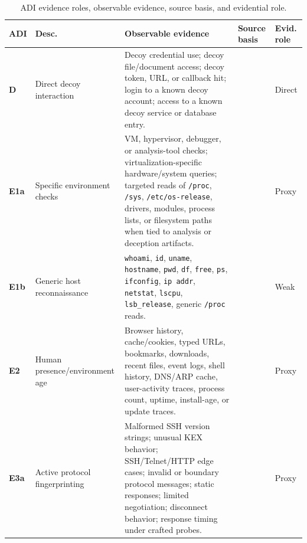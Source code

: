 \begin{table}[!t]
\centering
\caption{ADI evidence roles, observable evidence, source basis, and evidential role.}
\label{tab:adi-evidence-model}
\scriptsize
\setlength{\tabcolsep}{2.5pt}
\renewcommand{\arraystretch}{1.12}
\begin{tabular}[l,l,c,c,c]{p{}p{}p{}p{}p{}}
\hline
\textbf{ADI} &
\textbf{Desc.} &
\textbf{Observable evidence} &
\textbf{Source basis} &
\textbf{Evid. role} \\
\hline

\textbf{D} &
Direct decoy interaction &
Decoy credential use; decoy file/document access; decoy token, URL, or callback hit; login to a known decoy account; access to a known decoy service or database entry. &
\cite{mitre_d3fend_decoy_object,mitre_d3fend_decoy_file,mitre_d3fend_decoy_user_credential,mitre_d3fend_decoy_session_token,reti2020rabbit,cowrie} &
Direct \\

\textbf{E1a} &
Specific environment checks &
VM, hypervisor, debugger, or analysis-tool checks; virtualization-specific hardware/system queries; targeted reads of \texttt{/proc}, \texttt{/sys}, \texttt{/etc/os-release}, drivers, modules, process lists, or filesystem paths when tied to analysis or deception artifacts. &
\cite{mitre_attack_t1497_001,afianian2019malware,uitto2017survey} &
Proxy \\

\textbf{E1b} &
Generic host reconnaissance &
\texttt{whoami}, \texttt{id}, \texttt{uname}, \texttt{hostname}, \texttt{pwd}, \texttt{df}, \texttt{free}, \texttt{ps}, \texttt{ifconfig}, \texttt{ip addr}, \texttt{netstat}, \texttt{lscpu}, \texttt{lsb\_release}, generic \texttt{/proc} reads. &
\cite{cowrie} &
Weak \\

\textbf{E2} &
Human presence/environment age &
Browser history, cache/cookies, typed URLs, bookmarks, downloads, recent files, event logs, shell history, DNS/ARP cache, user-activity traces, process count, uptime, install-age, or update traces. &
\cite{miramirkhani2017spotless,mitre_attack_t1497_002,afianian2019malware} &
Proxy \\

\textbf{E3a} &
Active protocol fingerprinting &
Malformed SSH version strings; unusual KEX behavior; SSH/Telnet/HTTP edge cases; invalid or boundary protocol messages; static responses; limited negotiation; disconnect behavior; response timing under crafted probes. &
\cite{vetterl2018bitter,srinivasa2023gotta,uitto2017survey,chaudhry2026review} &
Proxy \\


\end{tabular}
\end{table}
